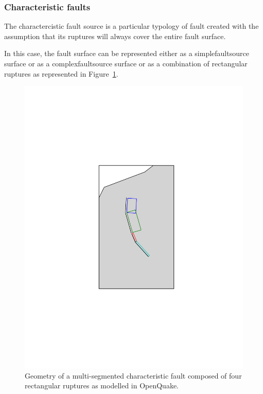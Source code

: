 \subsubsection{Characteristic faults}

The charactercistic fault source is a particular typology of fault created
with the assumption that its ruptures will always cover the entire fault
surface.

In this case, the fault surface can be represented either as a
\gls{simplefaultsource} surface or as a \gls{complexfaultsource} surface or as
a combination of rectangular ruptures as represented in
Figure~\ref{fig:char_fault_source}.

\begin{figure}[!ht]
\centering
\includegraphics[width=15cm]{figures/hazard/multi_surface.pdf}
\caption{Geometry of a multi-segmented characteristic fault composed of four
         rectangular ruptures as modelled in OpenQuake.}
\label{fig:char_fault_source}
\end{figure}

